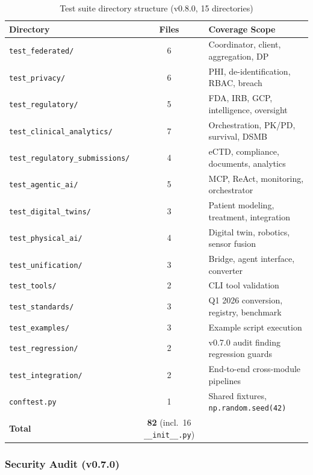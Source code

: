 \begin{table}[H]
\centering
\caption{Test suite directory structure (v0.8.0, 15 directories)}
\label{tab:tests}
\small
\begin{tabular}{@{}lcp{4.5cm}@{}}
\toprule
\textbf{Directory} & \textbf{Files} & \textbf{Coverage Scope} \\
\midrule
\texttt{test\_federated/} & 6 & Coordinator, client, aggregation, DP \\
\texttt{test\_privacy/} & 6 & PHI, de-identification, RBAC, breach \\
\texttt{test\_regulatory/} & 5 & FDA, IRB, GCP, intelligence, oversight \\
\texttt{test\_clinical\_analytics/} & 7 & Orchestration, PK/PD, survival, DSMB \\
\texttt{test\_regulatory\_submissions/} & 4 & eCTD, compliance, documents, analytics \\
\texttt{test\_agentic\_ai/} & 5 & MCP, ReAct, monitoring, orchestrator \\
\texttt{test\_digital\_twins/} & 3 & Patient modeling, treatment, integration \\
\texttt{test\_physical\_ai/} & 4 & Digital twin, robotics, sensor fusion \\
\texttt{test\_unification/} & 3 & Bridge, agent interface, converter \\
\texttt{test\_tools/} & 2 & CLI tool validation \\
\texttt{test\_standards/} & 3 & Q1 2026 conversion, registry, benchmark \\
\texttt{test\_examples/} & 3 & Example script execution \\
\texttt{test\_regression/} & 2 & v0.7.0 audit finding regression guards \\
\texttt{test\_integration/} & 2 & End-to-end cross-module pipelines \\
\texttt{conftest.py} & 1 & Shared fixtures, \texttt{np.random.seed(42)} \\
\midrule
\textbf{Total} & \textbf{82} (incl.\ 16 \texttt{\_\_init\_\_.py}) & \\
\bottomrule
\end{tabular}
\end{table}

\subsubsection{Security Audit (v0.7.0)}


